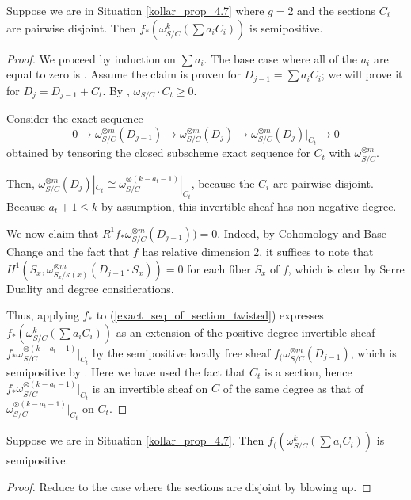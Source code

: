 \begin{lemma}\label{inductive_step_genus_2}
Suppose we are in Situation \ref{kollar_prop_4.7} where $g=2$ and the sections $C_i$ are pairwise disjoint.
Then $f_{*}(\omega_{S/C}^{k}(\sum a_iC_i))$ is semipositive.
\end{lemma}
\begin{proof}
We proceed by induction on $\sum a_i$. 
The base case where all of the $a_i$ are equal to zero is .
Assume the claim is proven for $D_{j-1}=\sum a_iC_i$; we will prove it for $D_{j}=D_{j-1}+C_t$.
By , $\omega_{S/C}\cdot C_t\ge0$.

Consider the exact sequence
\begin{equation*}\label{exact_seq_of_section_twisted}
0\to\omega_{S/C}^{\otimes m}(D_{j-1})\to\omega_{S/C}^{\otimes m}(D_j)\to \omega_{S/C}^{\otimes m}(D_j)|_{C_t}\to0
\end{equation*}
obtained by tensoring the closed subscheme exact sequence for $C_t$ with $\omega_{S/C}^{\otimes m}$.

Then, $\omega_{S/C}^{\otimes m}(D_j)|_{C_t}\cong \omega_{S/C}^{\otimes (k-a_{t}-1)}|_{C_t}$, because the $C_i$ are pairwise disjoint.
Because $a_{t}+1\le k$ by assumption, this invertible sheaf has non-negative degree.

We now claim that $R^{1}f_{*}\omega_{S/C}^{\otimes m}(D_{j-1}))=0$.
Indeed, by Cohomology and Base Change and the fact that $f$ has relative dimension 2, it suffices to note that $H^{1}(S_x,\omega_{S_x/\kappa(x)}^{\otimes m}(D_{j-1}\cdot S_x))=0$ for each fiber $S_x$ of $f$, which is clear by Serre Duality and degree considerations.


Thus, applying $f_{*}$ to (\ref{exact_seq_of_section_twisted}) expresses $f_{*}(\omega_{S/C}^{k}(\sum a_iC_i))$ as an extension of the positive degree invertible sheaf $f_{*}\omega_{S/C}^{\otimes (k-a_{t}-1)}|_{C_t}$ by the semipositive locally free sheaf $f_{(}\omega_{S/C}^{\otimes m}(D_{j-1})$, which is semipositive by .
Here we have used the fact that $C_t$ is a section, hence $f_{*}\omega_{S/C}^{\otimes (k-a_{t}-1)}|_{C_t}$ is an invertible sheaf on $C$ of the same degree as that of $\omega_{S/C}^{\otimes (k-a_{t}-1)}|_{C_t}$ on $C_t$.



\end{proof}



\begin{lemma}
Suppose we are in Situation \ref{kollar_prop_4.7}.
Then $f_{(}(\omega_{S/C}^{k}(\sum a_iC_i))$ is semipositive.
\end{lemma}
\begin{proof}
Reduce to the case where the sections are disjoint by blowing up.
\end{proof}




